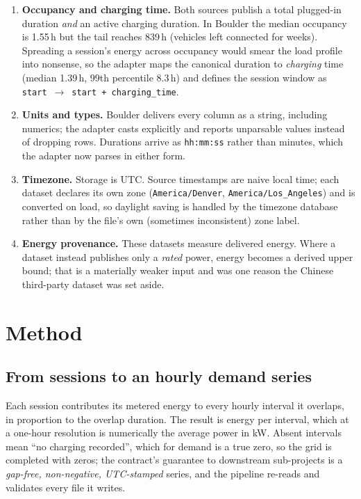 \documentclass[11pt,a4paper]{article}
\newcommand{\code}[1]{\texttt{\small #1}}
\begin{document}
\begin{enumerate}
  \item \textbf{Occupancy and charging time.} Both sources publish a total plugged-in
        duration \emph{and} an active charging duration. In Boulder the median occupancy is
        1.55\,h but the tail reaches 839\,h (vehicles left connected for weeks). Spreading a
        session's energy across occupancy would smear the load profile into nonsense, so the
        adapter maps the canonical duration to \emph{charging} time (median 1.39\,h,
        99th percentile 8.3\,h) and defines the session window as
        \code{start}~$\rightarrow$~\code{start + charging\_time}.
  \item \textbf{Units and types.} Boulder delivers every column as a string, including
        numerics; the adapter casts explicitly and reports unparsable values instead of
        dropping rows. Durations arrive as \code{hh:mm:ss} rather than minutes, which the
        adapter now parses in either form.
  \item \textbf{Timezone.} Storage is UTC. Source timestamps are naive local time; each
        dataset declares its own zone (\code{America/Denver}, \code{America/Los\_Angeles}) and
        is converted on load, so daylight saving is handled by the timezone database rather
        than by the file's own (sometimes inconsistent) zone label.
  \item \textbf{Energy provenance.} These datasets measure delivered energy. Where a dataset
        instead publishes only a \emph{rated} power, energy becomes a derived upper bound;
        that is a materially weaker input and was one reason the Chinese third-party dataset
        was set aside.
\end{enumerate}

\section{Method}\label{sec:method}

\subsection{From sessions to an hourly demand series}

Each session contributes its metered energy to every hourly interval it overlaps, in
proportion to the overlap duration. The result is energy per interval, which at a
one-hour resolution is numerically the average power in kW. Absent intervals mean ``no
charging recorded'', which for demand is a true zero, so the grid is completed with zeros;
the contract's guarantee to downstream sub-projects is a \emph{gap-free, non-negative,
UTC-stamped} series, and the pipeline re-reads and validates every file it writes.
\end{document}

